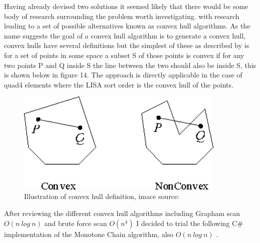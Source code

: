 \noindent
Having already devised two solutions it seemed likely that there would be some body of research surrounding the problem worth investigating. with research leading to a set of possible alternatives known as convex hull algorithms. As the name suggests the goal of a convex hull algorithm is to generate a convex hull, convex hulls have several definitions but the simplest of these as described by \cite{ConvexHulls} is for a set of points in some space a subset S of those points is convex if for any two points P and Q  inside S the line between the two should also be inside S, this is shown below in figure 14. The approach is directly applicable in the case of quad4 elements where the LISA sort order is the convex hull of the points.\\ 

\begin{figure}[!h]
  \centerline{\includegraphics[width=100mm , scale=1]{../Graphics/ConvexHullGraphic.png}}
  \caption{Illustration of convex hull definition, imace source: \cite{ConvexHulls}
  }
  \label{fig:h-refinementImp}
\end{figure}

\noindent
After reviewing the different convex hull algorithms including Grapham scan \cite{GrahamScan} $O(n\ log\ n)$ and brute force scan $O(n^4)$ \cite{ConvexHulls} \cite{BruteConvex} I decided to trial the following C\# implementation of the Monotone Chain algorithm, also $O(n\ log\ n)$ \cite{CSharpConvexHull}. \\ \\ \\ \\

